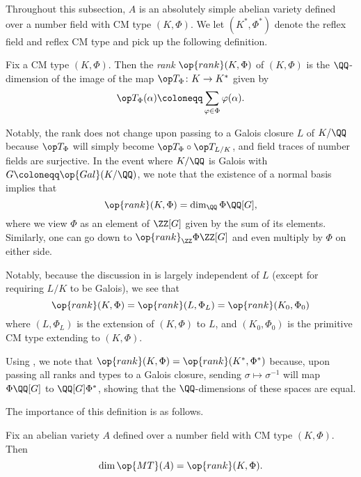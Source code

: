 \documentclass{article}
\begin{document}
Throughout this subsection, $A$ is an absolutely simple abelian variety defined over a number field with CM type $(K,\Phi)$. We let $(K^*,\Phi^*)$ denote the reflex field and reflex CM type and pick up the following definition.
\begin{definition}[rank]
	Fix a CM type $(K,\Phi)$. Then the \textit{rank} $\op{rank}(K,\Phi)$ of $(K,\Phi)$ is the $\QQ$-dimension of the image of the map $\op T_\Phi\colon K\to K^*$ given by
	\[\op T_\Phi(\alpha)\coloneqq\sum_{\varphi\in\Phi}\varphi(\alpha).\]
\end{definition}
\begin{remark} \label{rem:combinatorial-cm-rank}
	Notably, the rank does not change upon passing to a Galois closure $L$ of $K/\QQ$ because $\op T_\Phi$ will simply become ${\op T_\Phi}\circ\op T_{L/K}$, and field traces of number fields are surjective. In the event where $K/\QQ$ is Galois with $G\coloneqq\op{Gal}(K/\QQ)$, we note that the existence of a normal basis implies that
	\[\op{rank}(K,\Phi)=\dim_\QQ\Phi\QQ[G],\]
	where we view $\Phi$ as an element of $\ZZ[G]$ given by the sum of its elements. Similarly, one can go down to $\op{rank}_\ZZ\Phi\ZZ[G]$ and even multiply by $\Phi$ on either side.
\end{remark}
\begin{remark} \label{rem:reduce-to-primitive-cm-rank}
	Notably, because the discussion in  is largely independent of $L$ (except for requiring $L/K$ to be Galois), we see that
	\[\op{rank}(K,\Phi)=\op{rank}(L,\Phi_L)=\op{rank}(K_0,\Phi_0)\]
	where $(L,\Phi_L)$ is the extension of $(K,\Phi)$ to $L$, and $(K_0,\Phi_0)$ is the primitive CM type extending to $(K,\Phi)$.
\end{remark}
\begin{remark} \label{rem:dual-cm-rank}
	Using , we note that $\op{rank}(K,\Phi)=\op{rank}(K^*,\Phi^*)$ because, upon passing all ranks and types to a Galois closure, sending $\sigma\mapsto\sigma^{-1}$ will map $\Phi\QQ[G]$ to $\QQ[G]\Phi^*$, showing that the $\QQ$-dimen\-sions of these spaces are equal.
\end{remark}
The importance of this definition is as follows.
\begin{proposition}
	Fix an abelian variety $A$ defined over a number field with CM type $(K,\Phi)$. Then
	\[\dim\op{MT}(A)=\op{rank}(K,\Phi).\]
\end{proposition}
\end{document}
